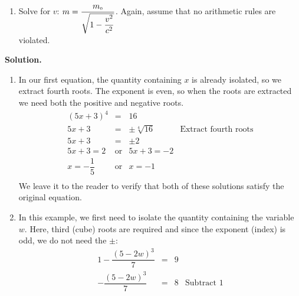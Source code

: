 \begin{ex}
\begin{multicols}{2}
\begin{enumerate}
\setcounter{HW}{\value{enumi}}
\end{enumerate}
\end{multicols}

\begin{enumerate}

\setcounter{enumi}{\value{HW}}

\item  Solve for $v$:  $m = \dfrac{m_{\text{\tiny$0$}}}{\sqrt{1 - \dfrac{v^2}{c^2}}}$.  Again, assume that no arithmetic rules are violated.

\setcounter{enumi}{\value{HW}}

\end{enumerate}


{\bf Solution.}

\begin{enumerate}

\item  In our first equation, the quantity containing $x$ is already isolated, so we extract fourth roots. The exponent is even, so when the roots are extracted we need both the positive and negative roots. \[ \begin{array}{rclr}

(5x +3)^{4} & = & 16 & \\ [2pt]

5x+3 & = & \pm \sqrt[4]{16} & \text{Extract fourth roots} \\ [2pt]

5x + 3 & = & \pm 2 & \\ [2pt]

5x+3 = 2 & \text{or} & 5x+3 = -2 & \\

x = -\dfrac{1}{5} & \text{or} & x = -1 \\ \end{array} \] We leave it to the reader to verify that both of these solutions satisfy the original equation.

\item  In this example, we first need to isolate the quantity containing the variable $w$.  Here, third (cube) roots are required and since the exponent (index) is odd, we do not need the $\pm$:\[ \begin{array}{rclr} 

1 - \dfrac{(5-2w)^3}{7} & = &  9 & \\ [8pt]


- \dfrac{(5-2w)^3}{7} & = & 8 & \text{Subtract $1$} \\[8pt]


\end{array}\]
\end{enumerate}
\end{ex}
